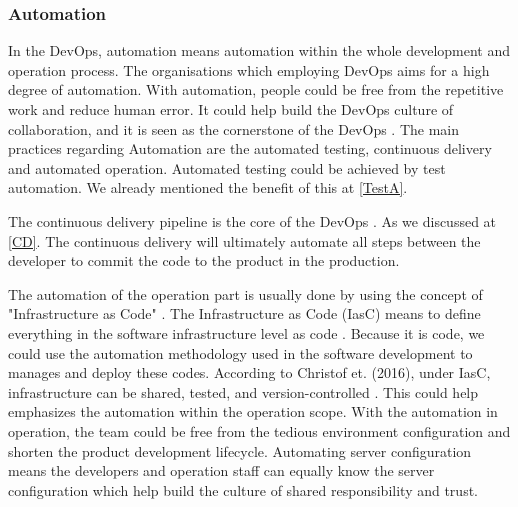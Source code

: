 \subsubsection[]{Automation}
In the DevOps, automation means 
automation within the whole development and operation process. The organisations which employing DevOps aims for a high degree of automation\cite{erich2017qualitative}.
With automation, people could be free from the repetitive work and reduce human error. It could help build the DevOps culture of collaboration, and it is seen as the cornerstone of the DevOps \cite{DevOpsCu76:online}.
The main practices regarding Automation are the automated testing, continuous delivery and automated operation. Automated testing could be achieved by test automation. We already mentioned the benefit of this at \ref{TestA}.
\par
The continuous delivery pipeline is the core of the DevOps \cite{gill2018devops}. As we discussed at \ref{CD}. The continuous delivery will ultimately automate all steps between the developer to commit the code to the product in the production.
\par
\label{iasc}
The automation of the operation part is usually done by using the concept of "Infrastructure as Code" \cite{lwakatare2015dimensions}. The Infrastructure as Code (IasC) means to define everything in the software infrastructure level as code \cite{artac2017devops}. Because it is code, we could use the automation methodology used in the software development to manages and deploy these codes. According to Christof et. (2016), under IasC, infrastructure can be shared, tested, and version-controlled \cite{ebert2016devops}. This could help emphasizes the automation within the operation scope. With the automation in operation, the team could be free from the tedious environment configuration and shorten the product development lifecycle. Automating server configuration means the developers and operation staff can equally know the server configuration \cite{DevOpsCu76:online} which help build the culture of shared responsibility and trust.

